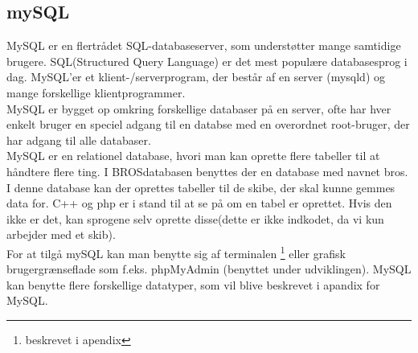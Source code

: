 \subsection{mySQL}
MySQL er en flertrådet SQL-databaseserver, som understøtter mange samtidige brugere. SQL(Structured Query Language) er det mest populære databasesprog i dag. MySQL'er et klient-/serverprogram, der består af en server (mysqld) og mange forskellige klientprogrammer.\\
MySQL er bygget op omkring forskellige databaser på en server, ofte har hver enkelt bruger en speciel adgang til en databse med en overordnet root-bruger, der har adgang til alle databaser.\\
MySQL er en relationel database, hvori man kan oprette flere tabeller til at håndtere flere ting. I BROSdatabasen benyttes der en database med navnet bros. I denne database kan der oprettes tabeller til de skibe, der skal kunne gemmes data for. C++ og php er i stand til at se på om en tabel er oprettet. Hvis den ikke er det, kan sprogene selv oprette disse(dette er ikke indkodet, da vi kun arbejder med et skib). \\
For at tilgå mySQL kan man benytte sig af terminalen \footnote{beskrevet i apendix} eller grafisk brugergrænseflade som f.eks. phpMyAdmin (benyttet under udviklingen).
MySQL kan benytte flere forskellige datatyper, som vil blive beskrevet i apandix for MySQL. 






